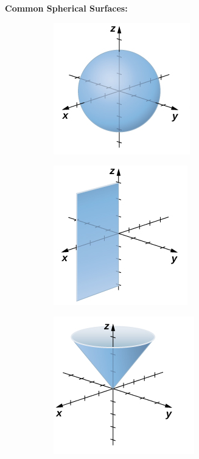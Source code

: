 \documentclass{article}
\begin{document}
            \noindent \textbf{Common Spherical Surfaces:} \\

            \begin{figure} [hbt!]
                \centering
                \begin{subfigure}{.33\textwidth}
                    \includegraphics[scale=0.6]{Resources/Unit3Vectors/sphere.PNG}
                \end{subfigure}
                \begin{subfigure}{.33\textwidth}
                    \includegraphics[scale=0.6]{Resources/Unit3Vectors/halfplane.PNG}
                \end{subfigure}
                \begin{subfigure}{.33\textwidth}
                    \includegraphics[scale=0.6]{Resources/Unit3Vectors/halfcone.PNG}
                \end{subfigure}
            \end{figure}
\end{document}
